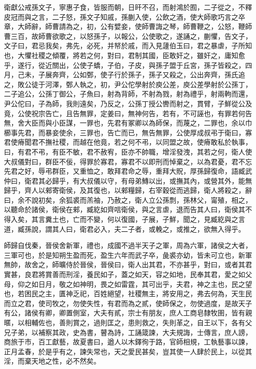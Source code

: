 \begin{pinyinscope}
衛獻公戒孫文子，寧惠子食，皆服而朝，日旰不召，而射鴻於囿，二子從之，不釋皮冠而與之言，二子怒，孫文子知戚，孫蒯入使，公飲之酒，使大師歌巧言之卒章，大師辭，師曹請為之，初，公有嬖妾，使師曹誨之琴，師曹鞭之，公怒，鞭師曹三百，故師曹欲歌之，以怒孫子，以報公，公使歌之，遂誦之，蒯懼，告文子，文子曰，君忌我矣，弗先，必死，并帑於戚，而入見蘧伯玉曰，君之暴虐，子所知也，大懼社稷之傾覆，將若之何，對曰，君制其國，臣敢奸之，雖奸之，庸知愈乎，遂行，從近關出，公使子蟜，子伯，子皮，與孫子盟于丘宮，孫子皆殺之，四月，己未，子展奔齊，公如鄄，使子行於孫子，孫子又殺之，公出奔齊，孫氏追之，敗公徒于河澤，鄄人執之，初，尹公佗學射於庾公差，庾公差學射於公孫丁，二子追公，公孫丁御公，子魚曰，射為背師，不射為戮，射為禮乎，射兩軥而還，尹公佗曰，子為師，我則遠矣，乃反之，公孫丁授公轡而射之，貫臂，子鮮從公及竟，公使祝宗告亡，且告無罪，定姜曰，無神何告，若有，不可誣也，有罪若何告無，舍大臣而與小臣謀，一罪也，先君有冢卿以為師保，而蔑之，二罪也，余以巾櫛事先君，而暴妾使余，三罪也，告亡而已，無告無罪，公使厚成叔弔于衛曰，寡君使瘠聞君不撫社稷，而越在他竟，若之何不弔，以同盟之故，使瘠敢私於執事，曰，有君不弔，有臣不敏，君不赦宥，臣亦不帥職，增淫發洩，其若之何，衛人使大叔儀對曰，群臣不佞，得罪於寡君，寡君不以即刑而悼棄之，以為君憂，君不忘先君之好，辱弔群臣，又重恤之，敢拜君命之辱，重拜大貺，厚孫歸復命，語臧武仲曰，衛君其必歸乎，有大叔儀以守，有母弟鱄以出，或撫其內，或營其外，能無歸乎，齊人以郲寄衛侯，及其復也，以郲糧歸，右宰穀從而逃歸，衛人將殺之，辭曰，余不說初矣，余狐裘而羔袖，乃赦之，衛人立公孫剽，孫林父，甯殖，相之，以聽命於諸侯，衛侯在郲，臧紇如齊唁衛侯，與之言虐，退而告其人曰，衛侯其不得入矣，其言糞土也，亡而不變，何以復國，子展，子鮮，聞之，見臧紇與之言道，臧孫說，謂其人曰，衛君必入，夫二子者，或輓之，或推之，欲無入得乎。

師歸自伐秦，晉侯舍新軍，禮也，成國不過半天子之軍，周為六軍，諸侯之大者，三軍可也，於是知朔生盈而死，盈生六年而武子卒，彘裘亦幼，皆未可立也，新軍無帥，故舍之，師曠侍於晉侯，晉侯曰，衛人出其君，不亦甚乎，對曰，或者其君實甚，良君將賞善而刑淫，養民如子，蓋之如天，容之如地，民奉其君，愛之如父母，仰之如日月，敬之如神明，畏之如雷霆，其可出乎，夫君，神之主也，民之望也，若困民之主，匱神乏祀，百姓絕望，社稷無主，將安用之，弗去何為，天生民而立之君，使司牧之，勿使失性，有君而為之貳，使師保之，勿使過度，是故天子有公，諸侯有卿，卿置側室，大夫有貳，宗士有朋友，庶人工商皂隸牧圉，皆有親暱，以相輔佐也，善則賞之，過則匡之，患則救之，失則革之，自王以下，各有父兄子弟，以補察其政，史為書，瞽為詩，工誦箴諫，大夫規誨，士傳言，庶人謗，商旅于市，百工獻藝，故夏書曰，遒人以木鐸徇于路，官師相規，工執藝事以諫，正月孟春，於是乎有之，諫失常也，天之愛民甚矣，豈其使一人肆於民上，以從其淫，而棄天地之性，必不然矣。


\end{pinyinscope}
